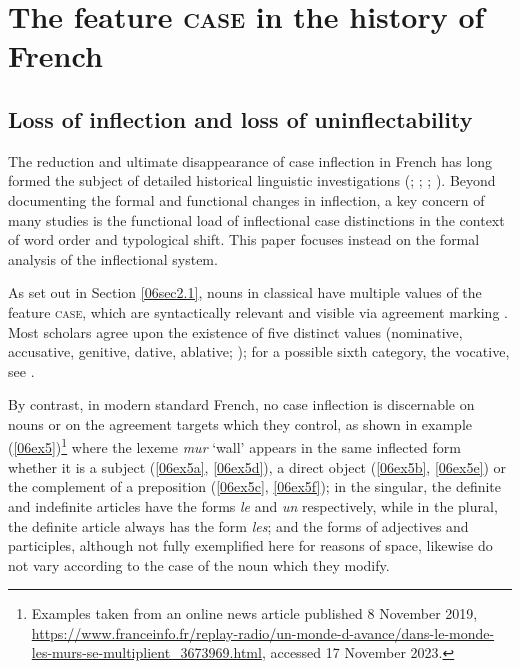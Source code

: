 \documentclass[output=paper,colorlinks,citecolor=brown]{langscibook}
\begin{document}
\section{The feature \textsc{case} in the history of French} \label{06sec4}

\subsection{Loss of inflection and loss of uninflectability} \label{06sec4.1}

The reduction and ultimate disappearance of case inflection in French has long formed the subject of detailed historical linguistic investigations (\citealt{schosler1984, schosler2013, reenenschosler2000}; \citealt[18--35]{sornicola2011}; \citealt[281--289]{smith2011}; \citealt{ledgeway2012, buridant2019, simswilliamsbaerman2021}). Beyond documenting the formal and functional changes in inflection, a key concern of many studies is the functional load of inflectional case distinctions in the context of word order and typological shift. This paper focuses instead on the formal analysis of the inflectional system.

As set out in Section \ref{06sec2.1}, nouns in classical  have multiple values of the feature \textsc{case}, which are syntactically relevant and visible via agreement marking \citep{corbett2006}. Most scholars agree upon the existence of five distinct values (nominative, accusative, genitive, dative, ablative; \citealt{dragomirescunicolae2016}); for a possible sixth category, the vocative, see \citet{ashdowne2016}.

By contrast, in modern standard French, no case inflection is discernable on nouns or on the agreement targets which they control, as shown in example (\ref{06ex5})\footnote{Examples taken from an online news article published 8 November 2019, \url{https://www.franceinfo.fr/replay-radio/un-monde-d-avance/dans-le-monde-les-murs-se-multiplient_3673969.html}, accessed 17 November 2023.} where the lexeme \emph{mur} `wall' appears in the same inflected form whether it is a subject (\ref{06ex5a}, \ref{06ex5d}), a direct object (\ref{06ex5b}, \ref{06ex5e}) or the complement of a preposition (\ref{06ex5c}, \ref{06ex5f}); in the singular, the definite and indefinite articles have the forms \emph{le} and \emph{un} respectively, while in the plural, the definite article always has the form \emph{les}; and the forms of adjectives and participles, although not fully exemplified here for reasons of space, likewise do not vary according to the case of the noun which they modify.
\end{document}
